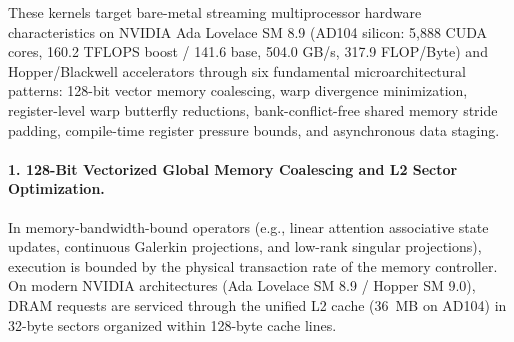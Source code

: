 These kernels target bare-metal streaming multiprocessor hardware characteristics on NVIDIA Ada Lovelace SM 8.9 (AD104 silicon: 5,888 CUDA cores, 160.2 TFLOPS boost / 141.6 base, 504.0 GB/s, 317.9 FLOP/Byte) and Hopper/Blackwell accelerators through six fundamental microarchitectural patterns: 128-bit vector memory coalescing, warp divergence minimization, register-level warp butterfly reductions, bank-conflict-free shared memory stride padding, compile-time register pressure bounds, and asynchronous data staging.

\paragraph{1. 128-Bit Vectorized Global Memory Coalescing and L2 Sector Optimization.}
In memory-bandwidth-bound operators (e.g., linear attention associative state updates, continuous Galerkin projections, and low-rank singular projections), execution is bounded by the physical transaction rate of the memory controller. On modern NVIDIA architectures (Ada Lovelace SM 8.9 / Hopper SM 9.0), DRAM requests are serviced through the unified L2 cache (36~MB on AD104) in 32-byte sectors organized within 128-byte cache lines.

